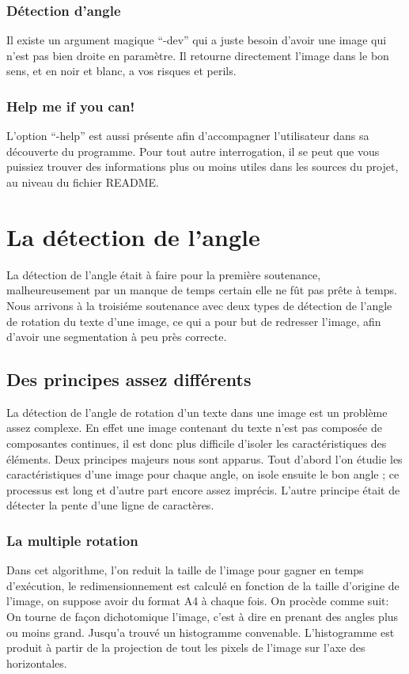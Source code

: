 \subsection{ D\'etection d'angle}
 Il existe un argument magique ``-dev'' qui a juste besoin d'avoir une
 image qui n'est pas bien droite en param\`etre. Il retourne directement
 l'image dans le bon sens, et en noir et blanc, a vos risques et perils.
\subsection{ Help me if you can! }
 L'option ``-help'' est aussi pr\'esente afin d'accompagner
 l'utilisateur dans sa d\'ecouverte du programme. Pour tout autre
 interrogation, il se peut que vous puissiez trouver des informations
 plus ou moins utiles dans les sources du projet, au niveau du fichier
 README.


\chapter{ La d\'etection de l'angle }
 La d\'etection de l'angle \'etait \`a faire pour la premi\`ere
 soutenance, malheureusement par un manque de temps certain elle ne f\^ut
 pas pr\^ete \`a temps. Nous arrivons \`a la troisi\'eme soutenance avec
 deux types de d\'etection de l'angle de rotation du texte d'une image,
 ce qui a pour but de redresser l'image, afin d'avoir une segmentation
 \`a peu pr\`es correcte.

\section{ Des principes assez diff\'erents}
 La d\'etection de l'angle de rotation d'un texte dans une image est un
 probl\`eme assez complexe. En effet une image contenant du texte n'est
 pas compos\'ee de composantes continues, il est donc plus difficile d'isoler
 les caract\'eristiques des \'el\'ements. Deux principes majeurs nous
 sont apparus. Tout d'abord l'on \'etudie les caract\'eristiques d'une
 image pour chaque angle, on isole ensuite le bon angle ; ce
 processus est long et d'autre part encore assez impr\'ecis.
 L'autre principe \'etait de d\'etecter la pente d'une ligne de caract\`eres.
\subsection{ La multiple rotation }
 Dans cet algorithme, l'on reduit la taille de l'image pour gagner en
 temps d'ex\'ecution, le redimensionnement est calcul\'e en fonction de la
 taille d'origine de l'image, on suppose avoir du format A4 \`a chaque
 fois. On proc\`ede comme suit: On tourne de fa\c con dichotomique
 l'image, c'est \`a dire en prenant des angles plus ou moins
 grand. Jusqu'a trouv\'e un histogramme convenable. L'histogramme est
 produit \`a partir de la projection de tout les pixels de l'image sur
 l'axe des horizontales.

